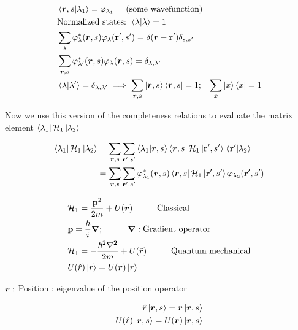 \begin{align}
	&\braket{\bm{r},s}{\lambda_1} = \varphi_{\lambda_{1}} \hspace{0.5cm} \text{(some wavefunction)} \nonumber\\
	&\text{Normalized states: } \braket{\lambda}{\lambda}=1 \nonumber \\
	&\sum_\lambda \varphi_\lambda^* (\bm{r},s) \varphi_\lambda (\vb{r'},s') = \delta(\bm{r}-\vb{r'}) \delta_{s,s'}\\
	&\sum_{\bm{r},s} \varphi_{\lambda'}^* (\bm{r},s) \varphi_\lambda (\bm{r},s) = \delta_{\lambda, \lambda'}\\
	& \braket{\lambda}{\lambda'}= \delta_{\lambda, \lambda'} \implies \sum_{\bm{r},s} \ket{\bm{r},s} \bra{\bm{r},s} = 1 ; \hspace{0.3cm} \sum_x \ket{x}\bra{x}=1
\end{align}

\noindent Now we use this version of the completeness relations to evaluate the matrix element $\bra{\lambda_1} \mathcal{H}_1 \ket{\lambda_2}$

\begin{align}
	\bra{\lambda_1} \mathcal{H}_1 \ket{\lambda_2} &= \sum_{\bm{r},s} \sum_{\vb{r'},s'} \braket{\lambda_1}{\bm{r},s} \bra{\bm{r},s} \mathcal{H}_1 \ket*{\vb{r'},s'} \braket*{\vb{r'}}{\lambda_2}\\
	&=  \sum_{\bm{r},s} \sum_{\vb{r'},s'} \varphi_{\lambda_1}^* (\bm{r},s)  \bra{\bm{r},s} \mathcal{H}_1 \ket*{\vb{r'},s'} \varphi_{\lambda_2} (\vb{r'},s') \nonumber
\end{align}

\begin{align}
	&\Ha_1 = \frac{\vb{p}^2}{2m}+ U(\vr) \hspace{1cm} \text{Classical}\\
	&\vb{p}= \frac{\hbar}{i} \vb{\gradient}  ;  \hspace{1cm} \vb{\gradient}: \text{Gradient operator}\\
	&\Ha_1 =  - \frac{\hbar^2 \vb{\laplacian}}{2m} + U(\hat{r}) \hspace{1cm} \text{Quantum mechanical}\\
	& U(\hat{r}) \ket{r} = U(\vr)\ket{r}
\end{align}

\noindent $\bm{r}:$ Position : eigenvalue of the position operator

\begin{align}
	\hat{r} \ket{\bm{r},s}= \bm{r} \ket{\bm{r}, s}\\
	U(\hat{r}) \ket{\bm{r},s}= U(\bm{r}) \ket{\bm{r},s}
\end{align}


